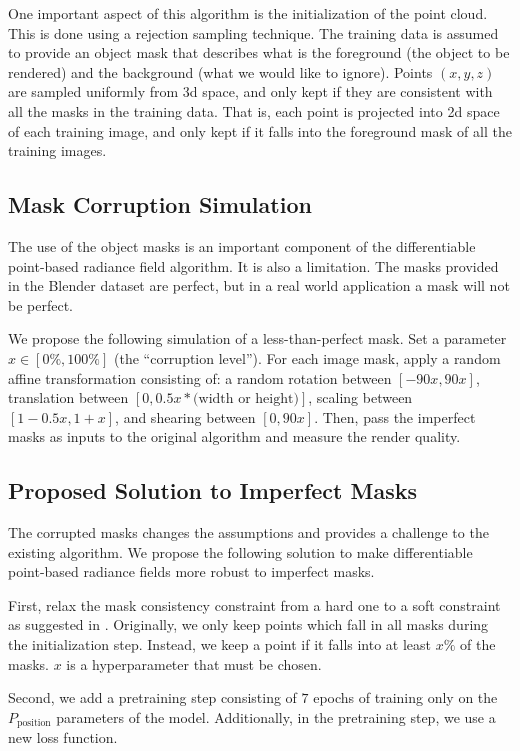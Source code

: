\documentclass[10pt,twocolumn,letterpaper]{article}
\begin{document}
One important aspect of this algorithm is the initialization of the point cloud. This is done using a rejection sampling technique. The training data is assumed to provide an object mask that describes what is the foreground (\ie the object to be rendered) and the background (\ie what we would like to ignore). Points $(x, y, z)$ are sampled uniformly from 3d space, and only kept if they are consistent with all the masks in the training data. That is, each point is projected into 2d space of each training image, and only kept if it falls into the foreground mask of all the training images.

\subsection{Mask Corruption Simulation}

The use of the object masks is an important component of the differentiable point-based radiance field algorithm. It is also a limitation. The masks provided in the Blender dataset \cite{mildenhall2020nerf} are perfect, but in a real world application a mask will not be perfect.

We propose the following simulation of a less-than-perfect mask. Set a parameter $x \in [0\%, 100\%]$ (\ie the ``corruption level''). For each image mask, apply a random affine transformation consisting of: a random rotation between $[-90x, 90x]$, translation between $[0, 0.5x*\text{(width or height)}]$, scaling between $[1-0.5x, 1+x]$, and shearing between $[0, 90x]$. Then, pass the imperfect masks as inputs to the original algorithm and measure the render quality.

\subsection{Proposed Solution to Imperfect Masks}

The corrupted masks changes the assumptions and provides a challenge to the existing algorithm. We propose the following solution to make differentiable point-based radiance fields more robust to imperfect masks.

First, relax the mask consistency constraint from a hard one to a soft constraint as suggested in \cite{zhang2022differentiable}. Originally, we only keep points which fall in all masks during the initialization step. Instead, we keep a point if it falls into at least $x\%$ of the masks. $x$ is a hyperparameter that must be chosen. 

Second, we add a pretraining step consisting of $7$ epochs of training only on the $P_\text{position}$ parameters of the model. Additionally, in the pretraining step, we use a new loss function.
\end{document}
